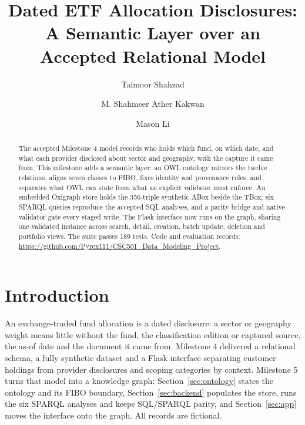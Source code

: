 \documentclass[sigconf,nonacm]{acmart}
\begin{document}
\title{Dated ETF Allocation Disclosures: A Semantic Layer over an Accepted Relational Model}

\author{Taimoor Shahzad}
\author{M. Shahmeer Ather Kakwan}
\author{Mason Li}

\renewcommand{\shortauthors}{Taimoor et al.}

\begin{abstract}
The accepted Milestone 4 model records who holds which fund,
on which date, and what each provider disclosed about sector and geography,
with the capture it came from. This milestone adds a semantic layer: an OWL
ontology mirrors the twelve relations, aligns seven classes to FIBO, fixes
identity and provenance rules, and separates what OWL can state from what an
explicit validator must enforce. An embedded Oxigraph store holds the 356-triple
synthetic ABox beside the TBox; six SPARQL queries reproduce the accepted SQL
analyses, and a parity bridge and native validator gate every staged write. The
Flask interface now runs on the graph, sharing one validated instance across
search, detail, creation, batch update, deletion and portfolio views. The suite
passes 189 tests. Code and evaluation records: \url{https://github.com/Pyrex111/CSC501_Data_Modeling_Project}.
\end{abstract}


\maketitle

\section{Introduction}
An exchange-traded fund allocation is a dated disclosure: a sector or geography
weight means little without the fund, the classification edition or captured
source, the as-of date and the document it came from. Milestone 4 delivered a
relational schema, a fully synthetic dataset and a Flask interface separating
customer holdings from provider disclosures and scoping categories by context.
Milestone 5 turns that model into a knowledge graph: Section~\ref{sec:ontology}
states the ontology and its FIBO boundary, Section~\ref{sec:backend} populates
the store, runs the six SPARQL analyses and keeps SQL/SPARQL parity, and
Section~\ref{sec:app} moves the interface onto the graph. All records are
fictional.
\end{document}
